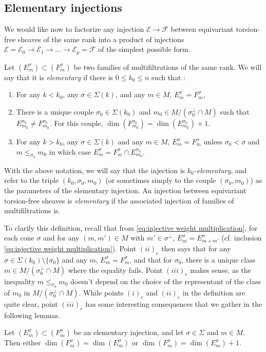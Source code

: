 \documentclass[a4paper,10pt]{amsart}
\theoremstyle{plain}{
    \newtheorem{theorem}{Theorem}[section]
    \newtheorem{lemma}[theorem]{Lemma}
    \newtheorem{corollary}[theorem]{Corollary}
    \newtheorem{proposition}[theorem]{Proposition}
    \newtheorem{conjecture}[theorem]{Conjecture}
}
\theoremstyle{definition}{
    \newtheorem{definition}[theorem]{Definition}
    \newtheorem{defn-thm}[theorem]{Definition-Theorem}
    \newtheorem{example}[theorem]{Example}
    \newtheorem{notation}[theorem]{Notation}
}
\theoremstyle{remark}{
    \newtheorem{remark}[theorem]{Remark}
    \newtheorem{problem}[theorem]{Problem}
    \newtheorem{question}[theorem]{Question}
}
\def\cF{\mathcal{F}}
\def\cE{\mathcal{E}}
\begin{document}
\subsection{Elementary injections}
\label{sec:elementary injections}
We would like now to factorize any injection $\cE\to \cF$ between equivariant torsion-free sheaves of the same rank into a product of injections $\cE=\cE_0\to\cE_1\to\ldots\to\cE_p=\cF$ of the simplest possible form. 
\begin{definition}
 \label{def:elementary injection}
 Let $(E^\sigma_m)\subset (F^\sigma_m)$ be two families of multifiltrations of the same rank. We will say that it is {\it elementary}  if there is $0\leq k_0\leq n$ such that :
 \begin{enumerate}
  \item[$(i)_e$] For any $k<k_0$, any $\sigma\in\Sigma(k)$, and any $m\in M$, $E^\sigma_m=F^\sigma_m$,
  \item[$(ii)_e$] There is a unique couple $\sigma_0\in\Sigma(k_0)$ and $m_0\in M/(\sigma_0^\perp\cap M)$ such that $E^{\sigma_0}_{m_0}\neq F^{\sigma_0}_{m_0}$. For this couple, $\dim(F^{\sigma_0}_{m_0})=\dim(E^{\sigma_0}_{m_0})+1$. 
  \item[$(iii)_e$] For any $k>k_0$, any $\sigma\in\Sigma(k)$ and any $m\in M$, $E^\sigma_m=F^\sigma_m$ unless $\sigma_0<\sigma$ and $m\leq_{\sigma_0} m_0$ in which case $E^\sigma_m=F^\sigma_m\cap E^{\sigma_0}_{m_0}$.
  \end{enumerate}
  With the above notation, we will say that the injection is {\it $k_0$-elementary}, and refer to the triple $(k_0,\sigma_0,m_0)$ (or sometimes simply to the couple $(\sigma_0,m_0)$) as the parameters of the elementary injection. An injection between equivariant torsion-free sheaves is {\it elementary} if the associated injection of families of multifiltrations is.
  \end{definition}
  

To clarify this definition, recall that from \eqref{eq:injective weight multiplication}, for each cone $\sigma$ and for any $(m,m')\in M$ with $m'\in \sigma^\perp$, $ E^{\sigma}_{m}=E^{\sigma}_{m+m'}$ (cf. inclusion \eqref{eq:injective weight multiplication}). Point $(ii)_e$ then says that for any $\sigma\in\Sigma(k_0)\setminus\lbrace \sigma_0\rbrace$ and any $m$, $E^\sigma_m=F^\sigma_m$, and that for $\sigma_0$, there is a unique class $m\in M/(\sigma_0^\perp\cap M)$ where the equality fails. Point $(iii)_e$ makes sense, as the inequality $m\leq_{\sigma_0} m_0$ doesn't depend on the choice of the representant of the class of $m_0$ in $M/(\sigma_0^\perp\cap M)$. While points $(i)_e$ and $(ii)_e$ in the definition are quite clear, point $(iii)_e$ has some interesting consequences that we gather in the following lemmas.
\begin{lemma}
 \label{lem:dim diff elementary injection}
 Let $(E^\sigma_m)\subset (F^\sigma_m)$ be an elementary injection, and let $\sigma\in\Sigma$ and $m\in M$. Then either $\dim(F^\sigma_m)=\dim(E^\sigma_m)$ 
or $\dim(F^\sigma_m)=\dim(E^\sigma_m)+1$.
\end{lemma}
\end{document}
